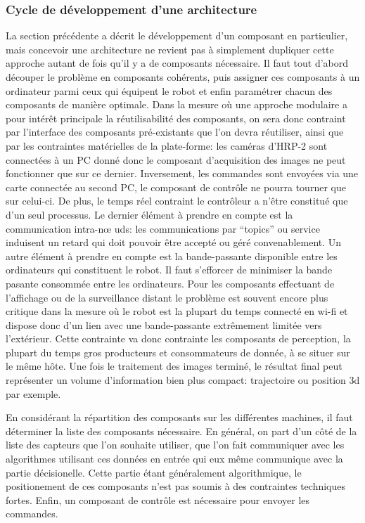 \subsubsection{Cycle de développement d'une architecture}


La section précédente a décrit le développement d'un composant en
particulier, mais concevoir une architecture ne revient pas à
simplement dupliquer cette approche autant de fois qu'il y a de
composants nécessaire. Il faut tout d'abord découper le problème en
composants cohérents, puis assigner ces composants à un ordinateur
parmi ceux qui équipent le robot et enfin paramétrer chacun des
composants de manière optimale. Dans la mesure où une approche
modulaire a pour intérêt principale la réutilisabilité des
composants, on sera donc contraint par l'interface des composants
pré-existants que l'on devra réutiliser, ainsi que par les contraintes
matérielles de la plate-forme: les caméras d'HRP-2 sont connectées à
un PC donné donc le composant d'acquisition des images ne peut
fonctionner que sur ce dernier. Inversement, les commandes sont
envoyées via une carte connectée au second PC, le composant de
contrôle ne pourra tourner que sur celui-ci. De plus, le temps réel
contraint le contrôleur a n'être constitué que d'un seul processus. Le
dernier élément à prendre en compte est la communication intra-n\oe
uds: les communications par ``topics'' ou service induisent un retard
qui doit pouvoir être accepté ou géré convenablement. Un autre élément
à prendre en compte est la bande-passante disponible entre les
ordinateurs qui constituent le robot. Il faut s'efforcer de minimiser
la bande pasante consommée entre les ordinateurs. Pour les composants
effectuant de l'affichage ou de la surveillance distant le problème
est souvent encore plus critique dans la mesure où le robot est la
plupart du temps connecté en wi-fi et dispose donc d'un lien avec une
bande-passante extrêmement limitée vers l'extérieur. Cette contrainte
va donc contrainte les composants de perception, la plupart du temps
gros producteurs et consommateurs de donnée, à se situer sur le même
hôte. Une fois le traitement des images terminé, le résultat final
peut représenter un volume d'information bien plus compact:
trajectoire ou position 3d par exemple.


En considérant la répartition des composants sur les différentes
machines, il faut déterminer la liste des composants nécessaire. En
général, on part d'un côté de la liste des capteurs que l'on souhaite
utiliser, que l'on fait communiquer avec les algorithmes utilisant ces
données en entrée qui eux même communique avec la partie
décisionelle. Cette partie étant généralement algorithmique, le
positionement de ces composants n'est pas soumis à des contraintes
techniques fortes. Enfin, un composant de contrôle est nécessaire pour
envoyer les commandes.


